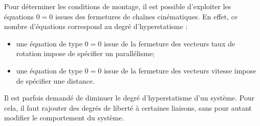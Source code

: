 \begin{methode}
Pour déterminer les conditions de montage, il est possible d'exploiter les équations $0=0$ issues des fermetures de chaînes cinématiques.  En effet, ce nombre d'équations correspond  au degré d'hyperstatisme :
\begin{itemize}
\item une équation de type $0=0$ issue de la fermeture des vecteurs taux de rotation impose de spécifier un parallélisme;
\item une équation de type $0=0$ issue de la fermeture des vecteurs vitesse impose de spécifier une distance.
\end{itemize}
\end{methode}

Il est parfois demandé de diminuer le degré d'hyperstatisme d'un système. Pour cela, il faut rajouter des degrés de liberté à certaines liaisons, sans pour autant modifier le comportement du système.


